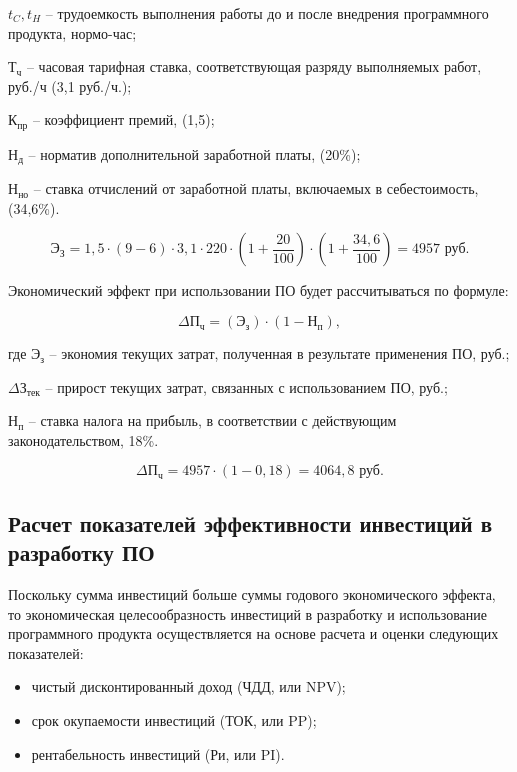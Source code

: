     $t_{C}, t_{H}$ -- трудоемкость выполнения работы до и после внедрения программного продукта, нормо-час;

    $\text{Т}_{\text{ч}}$ -- часовая тарифная ставка, соответствующая разряду выполняемых работ, руб./ч (3,1 руб./ч.);

    $\text{К}_{\text{пр}}$ -- коэффициент премий, (1,5);

    $\text{Н}_{\text{д}}$ -- норматив дополнительной заработной платы, (20\%);

    $\text{Н}_{\text{но}}$ -- ставка отчислений от заработной платы, включаемых в себестоимость, (34,6\%).

$$
    \text{Э}_{\text{З}} = 1,5 \cdot (9-6)\cdot 3,1\cdot 220 \cdot  (1+\frac{20}{100})\cdot (1+\frac{34,6}{100}) =  4957 \text{ руб}.
$$

Экономический эффект при использовании ПО будет рассчитываться по формуле:

\begin{equation}
    \Delta \text{П}_{\text{ч}} = (\text{Э}_{\text{з}})\cdot (1 - \text{Н}_{\text{п}}),
\end{equation}

где	$\text{Э}_{\text{з}}$ -- экономия текущих затрат, полученная в результате применения ПО, руб.;

    $\Delta \text{З}_{\text{тек}}$ -- прирост текущих затрат, связанных с использованием ПО, руб.;

    $\text{Н}_{\text{п}}$ --  ставка налога на прибыль, в соответствии с действующим законодательством, 18\%.

$$
    \Delta \text{П}_{\text{ч}} = 4957\cdot (1 - 0,18) = 4064,8 \text{ руб}.
$$

\subsection{Расчет показателей эффективности инвестиций в разработку ПО}
Поскольку сумма инвестиций больше суммы годового экономического эффекта, то экономическая целесообразность инвестиций в разработку и использование программного продукта осуществляется на основе расчета и оценки следующих показателей:

\begin{itemize}
    \item чистый  дисконтированный доход (ЧДД, или NPV);
    \item срок окупаемости инвестиций (ТОК, или PP);
    \item рентабельность инвестиций (Ри, или PI).
\end{itemize}

